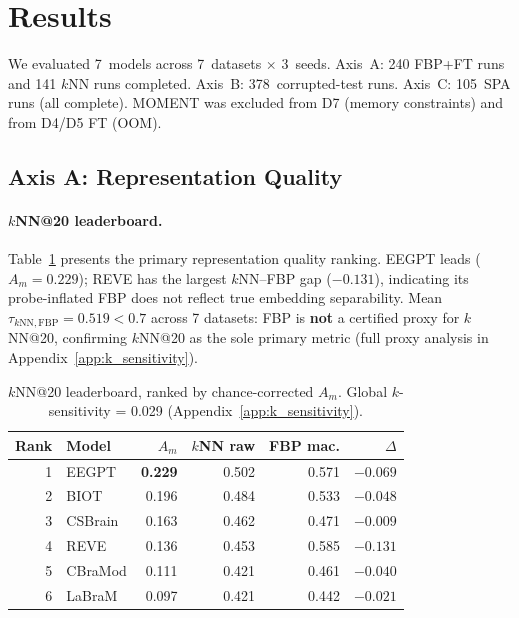 \documentclass{article}
\begin{document}
\section{Results}
\label{sec:results}

We evaluated 7~models across 7~datasets $\times$ 3~seeds. Axis~A: 240 FBP+FT runs and 141 $k$NN runs completed. Axis~B: 378~corrupted-test runs. Axis~C: 105~SPA runs (all complete). MOMENT was excluded from D7 (memory constraints) and from D4/D5 FT (OOM).

\subsection{Axis A: Representation Quality}
\label{sec:results_a}

\paragraph{$k$NN@20 leaderboard.}
Table~\ref{tab:knn_leaderboard} presents the primary representation quality ranking. EEGPT leads ($A_m = 0.229$); REVE has the largest $k$NN--FBP gap ($-0.131$), indicating its probe-inflated FBP does not reflect true embedding separability. Mean $\tau_{k\text{NN},\text{FBP}} = 0.519 < 0.7$ across 7 datasets: FBP is \textbf{not} a certified proxy for $k$NN@20, confirming $k$NN@20 as the sole primary metric (full proxy analysis in Appendix~\ref{app:k_sensitivity}).

\begin{table}[t]
  \caption{$k$NN@20 leaderboard, ranked by chance-corrected $A_m$. Global $k$-sensitivity = 0.029 (Appendix~\ref{app:k_sensitivity}).}
  \label{tab:knn_leaderboard}
  \centering
  \small
  \begin{tabular}{rlrrrr}
    \toprule
    Rank & Model & $A_m$ & $k$NN raw & FBP mac. & $\Delta$ \\
    \midrule
    1 & EEGPT & \textbf{0.229} & 0.502 & 0.571 & $-0.069$ \\
    2 & BIOT & 0.196 & 0.484 & 0.533 & $-0.048$ \\
    3 & CSBrain & 0.163 & 0.462 & 0.471 & $-0.009$ \\
    4 & REVE & 0.136 & 0.453 & 0.585 & $-0.131$ \\
    5 & CBraMod & 0.111 & 0.421 & 0.461 & $-0.040$ \\
    6 & LaBraM & 0.097 & 0.421 & 0.442 & $-0.021$ \\
    \bottomrule
  \end{tabular}
\end{table}
\end{document}
